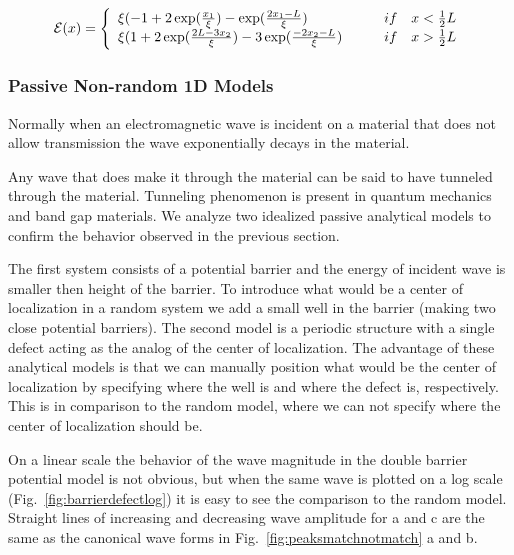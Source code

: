 \begin{equation}
{\cal E}(x) = \left\{
\begin{array}{l l}
  \xi (-1 + 2\exp( \frac{x_1}{\xi} ) -  \exp( \frac{2 x_1-L}{\xi} )      &  \quad \quad  if \quad x < \frac{1}{2}L  \\
  \xi ( 1 + 2\exp( \frac{2 L-3 x_2}{\xi} ) - 3\exp( \frac{-2 x_2-L}{\xi} )  & \quad \quad if \quad x > \frac{1}{2}L
\end{array} \right.
\label{eq:energyposition}
\end{equation}

\subsubsection {Passive Non-random 1D Models}

Normally when an electromagnetic wave is incident on a
material that does not allow transmission the wave
exponentially decays in the material.

Any wave that does make it through the material can be
said to have tunneled through the material.  Tunneling phenomenon
is present in quantum mechanics and band gap materials.
We analyze two idealized passive analytical models to confirm 
the behavior observed in the previous section. 

The first system consists of a potential barrier 
and the energy of incident wave is smaller then height of the barrier.
To introduce what would be a center of localization in
a random system we add a small well in the barrier (making
two close potential barriers).
The second model is a periodic structure with a single
defect acting as the analog of the center of localization.
The advantage of these analytical models is that we can
manually position what would be the center of localization
by specifying where the well is and where the defect
is, respectively. This is in comparison to the random model,
where we can not specify where the center of localization should be.

On a linear scale the behavior of the wave magnitude 
in the double barrier potential model is not
obvious, but when the same wave is plotted on a log
scale (Fig.~\ref{fig:barrierdefectlog}) it is
easy to see the comparison to the
random model.  Straight lines of increasing and
decreasing wave amplitude for a and c are the same as the canonical
wave forms in Fig.~\ref{fig:peaksmatchnotmatch} a and b.

